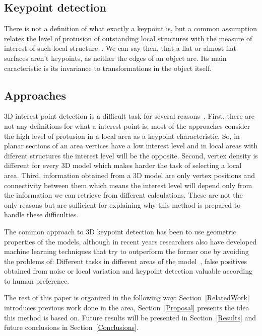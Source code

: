 \documentclass{comjnl}
\begin{document}
\subsection{Keypoint detection} \label{Keypoints}
There is not a definition of what exactly a keypoint is, but a common
assumption relates the level of protusion of outstanding local structures
with the measure of interest of such local structure~\cite{harris3D}.
We can say then, that a flat or almost flat surfaces aren't keypoints,
as neither the edges of an object are. Its main caracteristic is its
invariance to transformations in the object itself.  

\subsection{Approaches}
3D interest point detection is a difficult task for several reasons~\cite{Discrim, harris3D}. 
First, there are not any definitions for what a interest point is, 
most of the approaches consider the high level of protusion in a local
area as a keypoint characteristic. So, in planar sections of an area
vertices have a low interest level and in local areas with diferent
structures the interest level will be the opposite. Second, vertex 
density is different for every 3D model which makes harder the task of
selecting a local area. Third, information obtained from a 3D model
are only vertex positions and connectivity between them which means
the interest level will depend only from the information we can
retrieve from different calculations. These are not the only reasons
but are sufficient for explaining why this method is prepared to
handle these difficulties. 

The common approach to 3D keypoint detection has been to use 
geometric properties of the models, although in recent years researchers
also have developed machine learning techniques that try to outperform the
former one by avoiding the problems of: Different tasks in different areas
of the model~\cite{DNN}, false positives obtained from noise or local
variation and keypoint detection valuable according to human preference. 

The rest of this paper is organized in the following way:
Section~\ref{RelatedWork} introduces previous work done in the area,
Section~\ref{Proposal} presents the idea this method is based on. Future
results will be presented in Section~\ref{Results} and future conclusions
in Section~\ref{Conclusions}.
\end{document}
